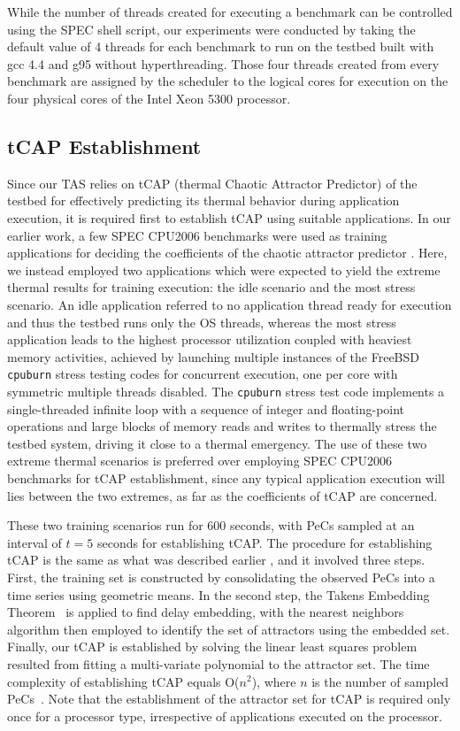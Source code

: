 \documentclass[times, 10pt,twocolumn]{IEEEtran}
\begin{document}
While the number of threads created for executing a benchmark
can be controlled using the SPEC shell script,
our experiments were conducted by taking the default value
of 4 threads for each benchmark to run on the testbed built with gcc 4.4 and g95 without hyperthreading.
Those four threads created from every benchmark are assigned
by the scheduler to the logical cores for execution on the four physical cores of the Intel Xeon 5300 processor.

\subsection{tCAP Establishment}
\label{sec:callibration}
Since our TAS relies on tCAP (thermal Chaotic Attractor Predictor) of
the testbed for effectively predicting its thermal behavior during
application execution, it is required first to establish tCAP using
suitable applications.  In our earlier work, a few SPEC CPU2006
benchmarks were used as training applications for deciding the
coefficients of the chaotic attractor predictor \cite{Lewis2010}.  Here,
we instead employed two applications which were expected to yield the
extreme thermal results for training execution: the idle scenario and
the most stress scenario.  An idle application referred to no
application thread ready for execution and thus the testbed runs only
the OS threads, whereas the most stress application leads to the highest
processor utilization coupled with heaviest memory activities, achieved
by launching multiple instances of the FreeBSD \texttt{cpuburn} stress
testing codes for concurrent execution, one per core with symmetric
multiple threads disabled.  The \texttt{cpuburn} stress test code
implements a single-threaded infinite loop with a sequence of integer
and floating-point operations and large blocks of memory reads and
writes to thermally stress the testbed system, driving it close to a
thermal emergency.  The use of these two extreme thermal scenarios is
preferred over employing SPEC CPU2006 benchmarks for tCAP establishment,
since any typical application execution will lies between the two
extremes, as far as the coefficients of tCAP are concerned.

These two training scenarios run for 600 seconds, with PeCs sampled at
an interval of $t=5$ seconds for establishing tCAP.  The procedure for
establishing tCAP is the same as what was described earlier
\cite{Lewis2010}, and it involved three steps. First, the training set
is constructed by consolidating the observed PeCs into a time series
using geometric means.  In the second step, the Takens Embedding
Theorem~\cite{Su2010} is applied to find delay embedding, with the
nearest neighbors algorithm then employed to identify the set of
attractors using the embedded set.  Finally, our tCAP is established by
solving the linear least squares problem resulted from fitting a
multi-variate polynomial to the attractor set.  The time complexity of
establishing tCAP equals O($n ^2$), where $n$ is the number of sampled
PeCs~\cite{Lewis2010}.  Note that the establishment of the attractor set
for tCAP is required only once for a processor type, irrespective of
applications executed on the processor.
\end{document}
